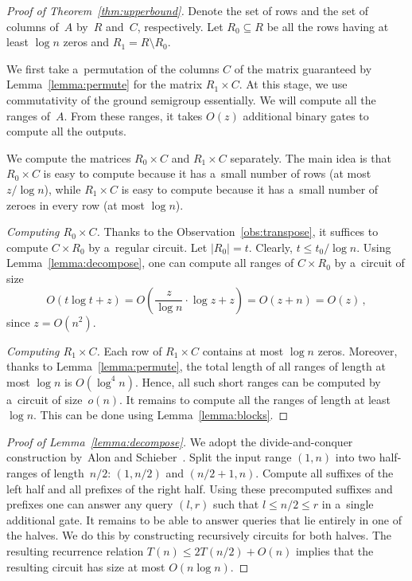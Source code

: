 \documentclass[11pt,letterpaper]{article}
\begin{document}
\begin{proof}[Proof of Theorem~\ref{thm:upperbound}]

Denote the set of rows and the set of columns of~$A$ by~$R$
and~$C$, respectively. Let $R_0 \subseteq R$ be all the rows
having at least $\log n$ zeros and $R_1=R \setminus R_0$.

We first take a~permutation of the columns $C$ of the matrix
guaranteed by Lemma~\ref{lemma:permute} for the matrix $R_1 \times C$. At this stage,
we use commutativity of the ground semigroup essentially.
We will compute all the ranges of~$A$. From these ranges,
it takes $O(z)$ additional binary gates to compute all the outputs.

We
compute the matrices $R_0 \times C$ and $R_1 \times C$
separately. The main idea is that $R_0 \times C$ is easy to compute
because it has a~small number of rows (at most $z/\log n$), while $R_1 \times C$
is easy to compute because it has a~small number of zeroes in every row (at most
$\log n$).

\emph{Computing $R_0 \times C$.} Thanks to the Observation~\ref{obs:transpose},
it suffices to compute $C \times R_0$ by a~regular circuit.
Let $|R_0|=t$. Clearly, $t \le t_0/\log n$.
Using Lemma~\ref{lemma:decompose}, one can compute all
ranges of $C \times R_0$ by a~circuit of size
\[O(t\log t+z)=O\left(\frac{z}{\log n} \cdot \log z+z\right)=O(z+n)=O(z)\, ,\]
since $z =O(n^2)$.

\emph{Computing $R_1 \times C$.} Each row of
$R_1 \times C$ contains at most $\log n$ zeros. Moreover,
thanks to Lemma~\ref{lemma:permute}, the total length of all
ranges of length at most $\log n$ is $O(\log^4n)$. Hence, all
such short ranges can be computed by a~circuit of
size~$o(n)$. It remains to compute all the ranges of
length at least~$\log n$. This can be done using Lemma~\ref{lemma:blocks}.
\end{proof}

\begin{proof}[Proof of Lemma~\ref{lemma:decompose}]
We adopt the divide-and-conquer construction by~Alon and Schieber~\cite{Alon87optimalpreprocessing}.
Split the input range $(1,n)$ into two half-ranges of
length~$n/2$:
$(1,n/2)$ and $(n/2+1,n)$.
Compute all suffixes of the left half and all prefixes of
the right half.
Using these precomputed suffixes and
prefixes one can answer any query $(l,r)$ such that $l \le n/2
\le r$ in a~single additional gate. It remains to be able to answer
queries that lie entirely in one of the halves. We do this by
constructing recursively circuits for both halves. The resulting
recurrence relation $T(n) \le 2T(n/2)+O(n)$ implies that the
resulting circuit has size at most $O(n\log n)$.
\end{proof}
\end{document}
